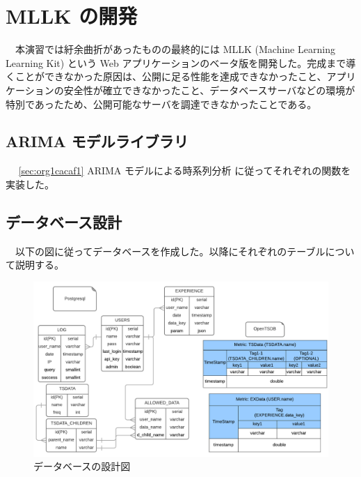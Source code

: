 \documentclass[dvipdfmx]{scrartcl}
\begin{document}
\section{MLLK の開発}
\label{sec:org98876de}
　本演習では紆余曲折があったものの最終的には MLLK (Machine Learning Learning Kit) という Web アプリケーションのベータ版を開発した。完成まで導くことができなかった原因は、公開に足る性能を達成できなかったこと、アプリケーションの安全性が確立できなかったこと、データベースサーバなどの環境が特別であったため、公開可能なサーバを調達できなかったことである。\\
\subsection{ARIMA モデルライブラリ}
\label{sec:orgc8e5200}
　 \ref{sec:org1cacaf1} ARIMA モデルによる時系列分析 に従ってそれぞれの関数を実装した。\\
\subsection{データベース設計}
\label{sec:orgc43ee77}
　以下の図に従ってデータベースを作成した。以降にそれぞれのテーブルについて説明する。\\
\begin{figure}[htbp]
\centering
\includegraphics[width=15cm]{./fool-diagram.png}
\caption{データベースの設計図}
\end{figure}
\end{document}
